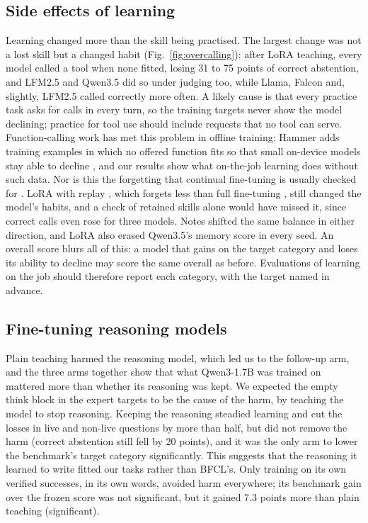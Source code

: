 \documentclass[a4paper,fleqn]{cas-dc}
\begin{document}
\subsection{Side effects of learning}\label{sec:side}
Learning changed more than the skill being practised. The largest change was not a lost skill but a changed habit
(Fig.~\ref{fig:overcalling}): after LoRA teaching, every model called a tool when none fitted, losing 31 to 75 points
of correct abstention, and LFM2.5 and Qwen3.5 did so under judging too, while Llama, Falcon and, slightly, LFM2.5 called correctly more often. A likely cause is that every practice task asks for calls in every turn, so the training targets never show the
model declining; practice for tool use should include requests that no tool can serve. Function-calling work has met
this problem in offline training: Hammer adds training examples in which no offered function fits so that small on-device models stay
able to decline \citep{lin2025robust}, and our results show what on-the-job learning does without such data. Nor is this
the forgetting that continual fine-tuning is usually checked for \citep{kirkpatrick2017overcoming,luo2025empirical}.
LoRA with replay \citep{rolnick2019experience}, which forgets less than full fine-tuning \citep{biderman2024lora},
still changed the model's habits, and a check of retained skills alone would have missed it, since correct calls even rose for three models. Notes shifted the same balance in
either direction, and LoRA also erased Qwen3.5's memory score in every seed. An overall score blurs all of this: a model
that gains on the target category and loses its ability to decline may score the same overall as before. Evaluations of
learning on the job should therefore report each category, with the target named in advance.

\subsection{Fine-tuning reasoning models}\label{sec:reasoningft}
Plain teaching harmed the reasoning model, which led us to the follow-up arm, and the three arms together show that
what Qwen3-1.7B was trained on mattered more than whether its reasoning was kept. We expected the empty think
block in the expert targets to be the cause of the harm, by teaching the model to stop reasoning. Keeping the reasoning
steadied learning and cut the losses in live and non-live questions by more than half, but did not remove the harm
(correct abstention still fell by 20 points), and it was the only arm to lower the benchmark's target category
significantly. This suggests that the reasoning it learned to write fitted our
tasks rather than BFCL's. Only training on its own verified successes, in its own words, avoided harm everywhere; its benchmark gain over the
frozen score was not significant, but it gained 7.3 points more than plain teaching (significant).
\end{document}
